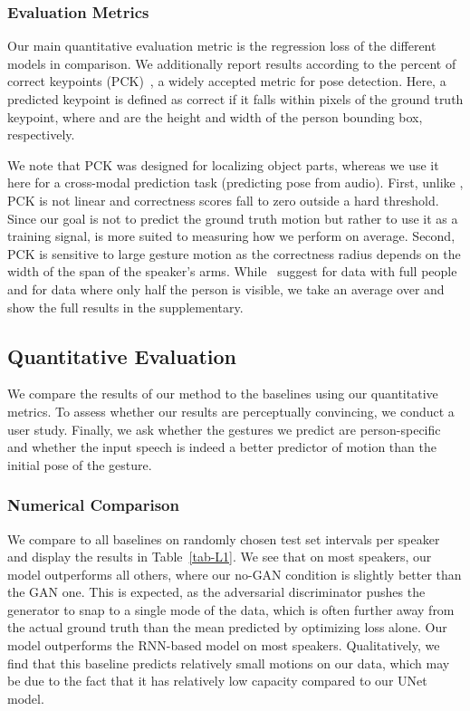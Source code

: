 \documentclass[10pt,twocolumn,letterpaper]{article}
\newcommand{\unet}{UNet}
\begin{document}
\subsubsection{Evaluation Metrics}
Our main quantitative evaluation metric is the  regression loss of the different models in comparison. We additionally report results according to the percent of correct keypoints (PCK)~\cite{pck}, a widely accepted metric for pose detection. Here, a predicted keypoint is defined as correct if it falls within  pixels of the ground truth keypoint, where  and  are the height and width of the person bounding box, respectively.

We note that PCK was designed for localizing object parts, whereas we use it here for a cross-modal prediction task (predicting pose from audio). First, unlike , PCK is not linear and correctness scores fall to zero outside a hard threshold. Since our goal is not to predict the ground truth motion but rather to use it as a training signal,  is more suited to measuring how we perform on average. Second, PCK is sensitive to large gesture motion as the correctness radius depends on the width of the span of the speaker's arms. While~\cite{pck} suggest  for data with full people and  for data where only half the person is visible, we take an average over  and show the full results in the supplementary.

\subsection{Quantitative Evaluation}
We compare the results of our method to the baselines using our quantitative metrics. To assess whether our results are perceptually convincing, we conduct a user study. Finally, we ask whether the gestures we predict are person-specific and whether the input speech is indeed a better predictor of motion than the initial pose of the gesture.

\subsubsection{Numerical Comparison} We compare to all baselines on  randomly chosen test set intervals per speaker and display the results in Table~\ref{tab-L1}. We see that on most speakers, our model outperforms all others, where our no-GAN condition is slightly better than the GAN one. This is expected, as the adversarial discriminator pushes the generator to snap to a single mode of the data, which is often further away from the actual ground truth than the mean predicted by optimizing  loss alone.
Our model outperforms the RNN-based model on most speakers. Qualitatively, we find that this baseline predicts relatively small motions on our data, which may be due to the fact that it has relatively low capacity compared to our \unet{} model.
\end{document}
